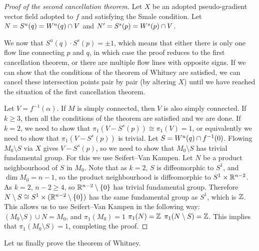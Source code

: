 \begin{proof}[Proof of the second cancellation theorem]
    Let $X$ be an adopted pseudo-gradient vector field adopted to  $f$ and satisfying the Smale condition.
    Let $N = S^{u}(q) = W^u(q) \cap V$ and $N' = S^{s}(p) = W^s(p) \cap  V$.

    We now that $S^{u}(q) \cdot S^{s}(p) = \pm 1$, which means that either there is only one flow line connecting $p$ and  $q$, in which case the proof reduces to the first cancellation theorem, or there are multiple flow lines with opposite signs.
    If we can show that the conditions of the theorem of Whitney are satisfied, we can cancel these intersection points pair by pair (by altering $X$) until we have reached the situation of the first cancellation theorem.

    Let $V = f^{-1}(\alpha)$.  If $M$ is simply connected, then $V$ is also simply connected.
    If $k \ge 3$, then all the conditions of the theorem are satisfied and we are done.
    If $k = 2$, we need to show that  $\pi_1(V - S^{s}(p)) \cong \pi_1(V) = 1$,
    or equivalently we need to show that $\pi_1(V - S^{s}(p))$ is trivial.
    Let $S = W^u(q) \cap f^{-1}(0)$.
    Flowing $M_0 \setminus S$ via $X$ gives  $V - S^{s}(p)$, so we need to show that $M_0 \setminus S$ has trivial fundamental group.
    For this we use Seifert--Van Kampen. Let $N$ be a product neighbourhood of $S$ in $M_0$.
    Note that as $k=2$, $S$ is diffeomorphic to $S^{1}$, and $\dim M_0 = n-1$, so the product neighbourhood is diffeomorphic to $ S^1 \times \mathbb{R}^{n-2}$.
    As $k=2$, $n - 2 \ge 4$, so $\mathbb{R}^{n-2} \setminus \{ 0 \} $ has trivial fundamental group. Therefore $N \setminus S \cong S^{1} \times (\mathbb{R}^{n-2}\setminus \{0\})$ has the same fundamental group as $S^{1}$, which is $\mathbb{Z}$.
    This allows us to use Seifert--Van Kampen in the following way:
    $(M_0 \setminus S) \cup N = M_0$, and $\pi_1(M_0) = 1$ $\pi_1(N) = \mathbb{Z}$ $\pi_1(N \setminus S) = \mathbb{Z}$. This implies that $\pi_1(M_0 \setminus S) = 1$, completing the proof.
\end{proof}

Let us finally prove the theorem of Whitney.

